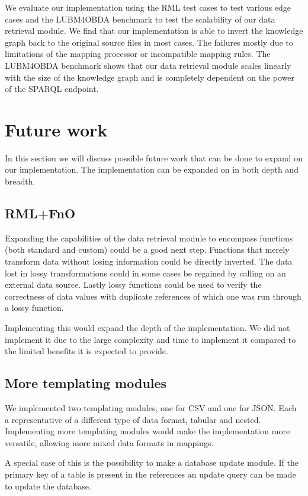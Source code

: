 We evaluate our implementation using the RML test cases to test various edge cases and the LUBM4OBDA benchmark to test the scalability of our data retrieval module. We find that our implementation is able to invert the knowledge graph back to the original source files in most cases. The failures mostly due to limitations of the mapping processor or incompatible mapping rules. The LUBM4OBDA benchmark shows that our data retrieval module scales linearly with the size of the knowledge graph and is completely dependent on the power of the SPARQL endpoint.

\section{Future work}
In this section we will discuss possible future work that can be done to expand on our implementation. The implementation can be expanded on in both depth and breadth. 

\subsection{RML+FnO}
Expanding the capabilities of the data retrieval module to encompass functions (both standard and custom) could be a good next step. Functions that merely transform data without losing information could be directly inverted. The data lost in lossy transformations could in some cases be regained by calling on an external data source. Lastly lossy functions could be used to verify the correctness of data values with duplicate references of which one was run through a lossy function.

Implementing this would expand the depth of the implementation. We did not implement it due to the large complexity and time to implement it compared to the limited benefits it is expected to provide.

\subsection{More templating modules}
We implemented two templating modules, one for CSV and one for JSON. Each a representative of a different type of data format, tabular and nested. Implementing more templating modules would make the implementation more versatile, allowing more mixed data formats in mappings. 

A special case of this is the possibility to make a database update module. If the primary key of a table is present in the references an update query can be made to update the database. 